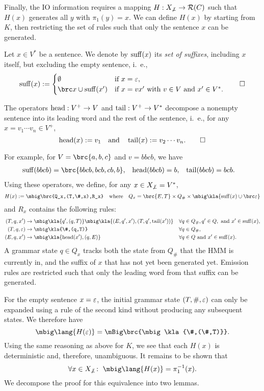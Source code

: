 Finally, the IO information requires a mapping $H: X_{\not\bot}\to\mathcal R(C)$ such
that $H(x)$ generates all $y$ with $\pi_1(y)=x$. We can define $H(x)$ by
starting from $K$, then restricting the set of rules such that only the
sentence $x$ can be generated.

\begin{definition}
 Let $x\in V^*$ be a sentence. We denote by $\operatorname{suff}(x)$ its
 \emph{set of suffixes}, including $x$ itself, but excluding the empty sentence, i.~e.,
 \[
  \suff(x) := \begin{cases}
   \emptyset & \text{if } x = \eps, \\
   \brc x \cup \suff(x') & \text{if } x = vx' \text{ with } v\in V\text{ and }x'\in V^*.
  \end{cases}\qedhere
 \]
\end{definition}

\begin{definition}
 The operators $\operatorname{head}:V^+\to V$ and $\operatorname{tail}:V^+\to V^*$ decompose a nonempty sentence into its leading word and the rest of the sentence, i.~e., for any $x = v_1\cdots v_n\in V^+$,
 \[
  \operatorname{head}(x) := v_1
  \quad\text{and}\quad
  \operatorname{tail}(x) := v_2\cdots v_n.
  \qedhere
 \]
\end{definition}

For example, for $V = \brc{a,b,c}$ and $v = bbcb$, we have
\begin{align*}
 \suff(bbcb) &= \brc{bbcb, bcb, cb, b}, &
 \car(bbcb) &= b, &
 \cdr(bbcb) &= bcb.
\end{align*}
Using these operators, we define, for any $x\in X_{\not\bot} = V^*$,
\[
 H(x) := \mbig\brc{Q_x,(T,\#,x),R_x} \quad\text{where}\quad Q_x = \brc{E,T} \times Q_\# \times \mbig\kla{\suff(x)\cup\brc\eps}
\]
and $R_x$ contains the following rules:
\label{eq:03-R_x}\begin{align*}
 (T,q,x') &\to \mbig\kla{q',(q,T)}\mbig\kla{(E,q',x'),(T,q',\cdr(x'))} && \forall q\in Q_\#,q'\in Q,\text{ and }x'\in\suff(x), \\
 (T,q,\eps) &\to \mbig\kla{\#,(q,T)} && \forall q\in Q_\#, \\
 (E,q,x') &\to \mbig\kla{\car(x'),(q,E)} && \forall q\in Q\text{ and }x'\in\suff(x).
\end{align*}
%
A grammar state $q\in Q_x$ tracks both the state from $Q_\#$ that the HMM is
currently in, and the suffix of $x$ that has not yet been generated yet. Emission
rules are restricted such that only the leading word from that suffix can be generated.

For the empty sentence $x=\varepsilon$, the initial grammar state $(T,\#,\varepsilon)$ can
only be expanded using a rule of the second kind without producing any subsequent states.
We therefore have
\[
 \mbig\lang{H(\eps)} = \mBig\brc{\mbig\kla{\#,(\#,T)}}.
\]
%
Using the same reasoning as above for $K$, we see that each $H(x)$ is
deterministic and, therefore, unambiguous. It remains to be shown that
\[
 \forall x\in X_{\not\bot}\colon\;
 \mbig\lang{H(x)} = \pi_1^{-1}(x).
\]
We decompose the proof for this equivalence into two lemmas.

